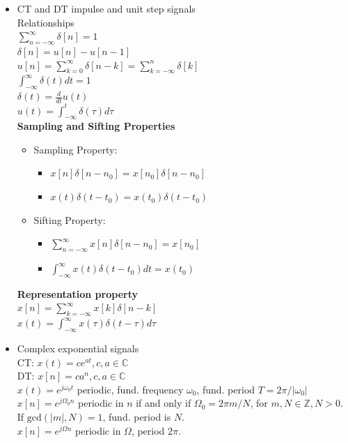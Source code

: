 \documentclass[10pt, twocolumn]{article}
\newcommand{\Ev}{\mathcal{E}v}
\newcommand{\Od}{\mathcal{O}d}
\newcommand{\gcdop}{\text{gcd}} %
\begin{document}
\begin{itemize}
\begin{itemize}
\begin{itemize}
            \end{itemize}
        \item Even-odd decomposition theorem: $x(t) = \Ev\{x(t)\} + \Od\{x(t)\}$ where $\Ev\{x(t)\} = \frac{x(t)+x(-t)}{2}$ and $\Od\{x(t)\} = \frac{x(t)-x(-t)}{2}$. (Similar for DT).
    \end{itemize}
    \item CT and DT impulse and unit step signals \\
    Relationships \\
    $\sum_{n=-\infty}^{\infty} \delta[n] = 1$ \\
    $\delta[n] = u[n] - u[n-1]$ \\
    $u[n] = \sum_{k=0}^{\infty} \delta[n-k] = \sum_{k=-\infty}^{n} \delta[k]$ \\
    $\int_{-\infty}^{\infty} \delta(t)dt = 1$ \\
    $\delta(t) = \frac{d}{dt}u(t)$ \\
    $u(t) = \int_{-\infty}^{t} \delta(\tau)d\tau$ \\
    \noindent\textbf{Sampling and Sifting Properties}
        \begin{itemize}
            \item Sampling Property:
                \begin{itemize}
                    \item $x[n]\delta[n-n_0] = x[n_0]\delta[n-n_0]$
                    \item $x(t)\delta(t-t_0) = x(t_0)\delta(t-t_0)$
                \end{itemize}
            \item Sifting Property:
                 \begin{itemize}
                    \item $\sum_{n=-\infty}^{\infty} x[n]\delta[n-n_0] = x[n_0]$
                    \item $\int_{-\infty}^{\infty} x(t)\delta(t-t_0)dt = x(t_0)$
                \end{itemize}
        \end{itemize}
    \noindent\textbf{Representation property} \\
    $x[n] = \sum_{k=-\infty}^{\infty} x[k]\delta[n-k]$ \\
    $x(t) = \int_{-\infty}^{\infty} x(\tau)\delta(t-\tau)d\tau$
    \item Complex exponential signals \\
    CT: $x(t) = ce^{at}, c, a \in \mathbb{C}$ \\
    DT: $x[n] = ca^n, c, a \in \mathbb{C}$ \\
    $x(t) = e^{j\omega_0 t}$ periodic, fund. frequency $\omega_0$, fund. period $T=2\pi/|\omega_0|$ \\
    $x[n] = e^{j\Omega_0 n}$ periodic in $n$ if and only if $\Omega_0 = 2\pi m/N$, for $m, N \in \mathbb{Z}, N>0$. If $\gcdop(|m|, N)=1$, fund. period is $N$. \\
    $x[n] = e^{j\Omega n}$ periodic in $\Omega$, period $2\pi$.
\end{itemize}
\end{document}
